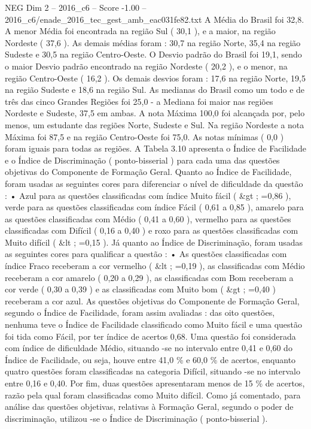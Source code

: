 \begin{textsample}{NEG Dim 2 – 2016\_c6 – Score -1.00 – 2016\_c6/enade\_2016\_tec\_gest\_amb\_eac031fe82.txt}
A Média do Brasil foi 32,8.
A menor Média foi encontrada na região Sul ( 30,1 ), e a maior, na região Nordeste ( 37,6 ).
As demais médias foram : 30,7 na região Norte, 35,4 na região Sudeste e 30,5 na região Centro-Oeste.
O Desvio padrão do Brasil foi 19,1, sendo o maior Desvio padrão encontrado na região Nordeste ( 20,2 ), e o menor, na região Centro-Oeste ( 16,2 ).
Os demais desvios foram : 17,6 na região Norte, 19,5 na região Sudeste e 18,6 na região Sul.
As medianas do Brasil como um todo e de três das cinco Grandes Regiões foi 25,0 - a Mediana foi maior nas regiões Nordeste e Sudeste, 37,5 em ambas.
A nota Máxima 100,0 foi alcançada por, pelo menos, um estudante das regiões Norte, Sudeste e Sul.
Na região Nordeste a nota Máxima foi 87,5 e na região Centro-Oeste foi 75,0.
As notas mínimas ( 0,0 ) foram iguais para todas as regiões.
A Tabela 3.10 apresenta o Índice de Facilidade e o Índice de Discriminação ( ponto-bisserial ) para cada uma das questões objetivas do Componente de Formação Geral.
Quanto ao Índice de Facilidade, foram usadas as seguintes cores para diferenciar o nível de dificuldade da questão : • Azul para as questões classificadas com índice Muito fácil ( \&gt ; =0,86 ), verde para as questões classificadas com índice Fácil ( 0,61 a 0,85 ), amarelo para as questões classificadas com Médio ( 0,41 a 0,60 ), vermelho para as questões classificadas com Difícil ( 0,16 a 0,40 ) e roxo para as questões classificadas com Muito difícil ( \&lt ; =0,15 ).
Já quanto ao Índice de Discriminação, foram usadas as seguintes cores para qualificar a questão : • As questões classificadas com índice Fraco receberam a cor vermelho ( \&lt ; =0,19 ), as classificadas com Médio receberam a cor amarelo ( 0,20 a 0,29 ), as classificadas com Bom receberam a cor verde ( 0,30 a 0,39 ) e as classificadas com Muito bom ( \&gt ; =0,40 ) receberam a cor azul.
As questões objetivas do Componente de Formação Geral, segundo o Índice de Facilidade, foram assim avaliadas : das oito questões, nenhuma teve o Índice de Facilidade classificado como Muito fácil e uma questão foi tida como Fácil, por ter índice de acertos 0,68.
Uma questão foi considerada com índice de dificuldade Médio, situando -se no intervalo entre 0,41 e 0,60 do Índice de Facilidade, ou seja, houve entre 41,0 \% e 60,0 \% de acertos, enquanto quatro questões foram classificadas na categoria Difícil, situando -se no intervalo entre 0,16 e 0,40.
Por fim, duas questões apresentaram menos de 15 \% de acertos, razão pela qual foram classificadas como Muito difícil.
Como já comentado, para análise das questões objetivas, relativas à Formação Geral, segundo o poder de discriminação, utilizou -se o Índice de Discriminação ( ponto-bisserial ).

\end{textsample}
